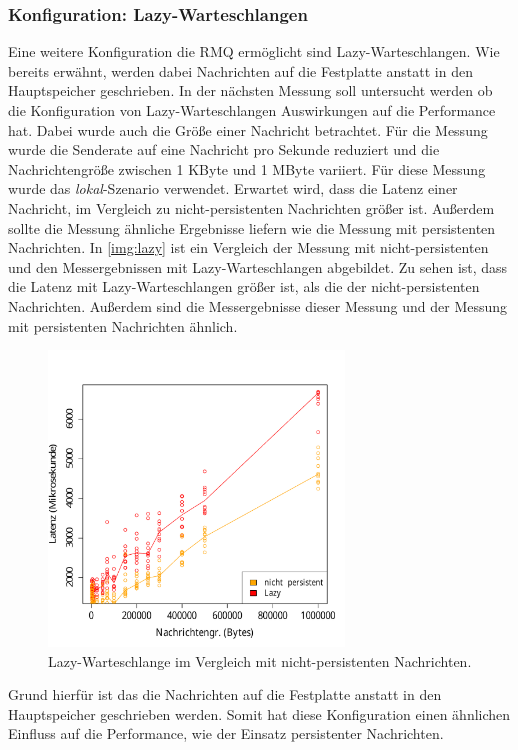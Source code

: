 \subsubsection{Konfiguration: Lazy-Warteschlangen}
\label{sec:rmqLazy}
Eine weitere Konfiguration die RMQ ermöglicht sind Lazy-Warteschlangen. Wie bereits erwähnt, werden dabei Nachrichten auf die Festplatte anstatt in den Hauptspeicher geschrieben. In der nächsten Messung soll untersucht werden ob die Konfiguration von Lazy-Warteschlangen Auswirkungen auf die Performance hat. Dabei wurde auch die Größe einer Nachricht betrachtet. Für die Messung wurde die Senderate auf eine Nachricht pro Sekunde reduziert und die Nachrichtengröße zwischen 1 KByte und 1 MByte variiert. Für diese Messung wurde das \textit{lokal}-Szenario verwendet. Erwartet wird, dass die Latenz einer Nachricht, im Vergleich zu nicht-persistenten Nachrichten größer ist. Außerdem sollte die Messung ähnliche Ergebnisse liefern wie die Messung mit persistenten Nachrichten.
In \autoref{img:lazy} ist ein Vergleich der Messung mit nicht-persistenten und den Messergebnissen mit Lazy-Warteschlangen abgebildet. Zu sehen ist, dass die Latenz mit Lazy-Warteschlangen größer ist, als die der nicht-persistenten Nachrichten. Außerdem sind die Messergebnisse dieser Messung und der Messung mit persistenten Nachrichten ähnlich.
\begin{figure}
\center
  \includegraphics[width=0.7\textwidth]{images/measurement/lazy-queues.pdf}
  \caption{Lazy-Warteschlange im Vergleich mit nicht-persistenten Nachrichten.}
  \label{img:lazy}
\end{figure}
Grund hierfür ist das die Nachrichten auf die Festplatte anstatt in den Hauptspeicher geschrieben werden. Somit hat diese Konfiguration einen ähnlichen Einfluss auf die Performance, wie der Einsatz persistenter Nachrichten.



